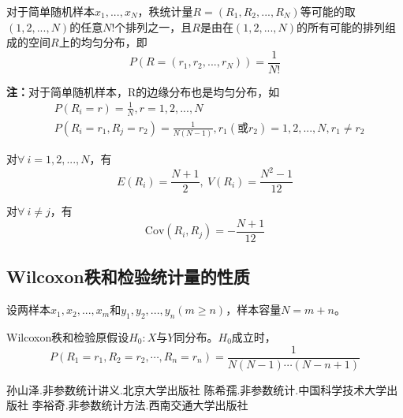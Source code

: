 \documentclass[lang=cn,10pt]{elegantbook}
\begin{document}
\begin{proposition}
    对于简单随机样本$x_1,...,x_{N}$，秩统计量$R = (R_1,R_2,...,R_N)$等可能的取$(1,2,...,N)$的任意$N!$个排列之一，且$R$是由在$(1,2,...,N)$的所有可能的排列组成的空间$R$上的均匀分布，即
    \begin{equation}
        P(R = (r_1,r_2,...,r_N)) = \frac{1}{N!}
    \end{equation}
\end{proposition}
\textbf{注：}对于简单随机样本，R的边缘分布也是均匀分布，如
\begin{equation}
    \begin{aligned}
        & P(R_i = r) = \frac1N, r = 1,2,...,N \\
        & P(R_i=r_1,R_j=r_2) = \frac1{N(N-1)}, r_1(\text{或}r_2) = 1,2,...,N, r_1\neq r_2
    \end{aligned}
\end{equation}

\begin{theorem}
    对$\forall~i = 1,2,...,N$，有
    \begin{equation}
        E(R_i)=\frac{N+1}2,~V(R_i)=\frac{N^2 -1}{12}
    \end{equation}
\end{theorem}

\begin{theorem}
    对$\forall~i \neq j$，有
    \begin{equation}
        \mathrm{Cov}(R_i,R_j) = -\frac{N+1}{12}
    \end{equation}
\end{theorem}

\subsection{Wilcoxon秩和检验统计量的性质}
设两样本$x_1,x_2,...,x_{m}$和$y_1,y_2,...,y_n(m \geq n)$，样本容量$N = m + n$。

Wilcoxon秩和检验原假设$H_0:X$与$Y$同分布。$H_0$成立时，
$$
    P(R_1=r_1,R_2=r_2,\cdots,R_n=r_n)=\frac1{N(N-1)\cdots(N-n+1)}
$$







\begin{thebibliography}{3}
    孙山泽.非参数统计讲义.北京大学出版社
    陈希孺.非参数统计.中国科学技术大学出版社
    李裕奇.非参数统计方法.西南交通大学出版社
\end{thebibliography}
\end{document}
